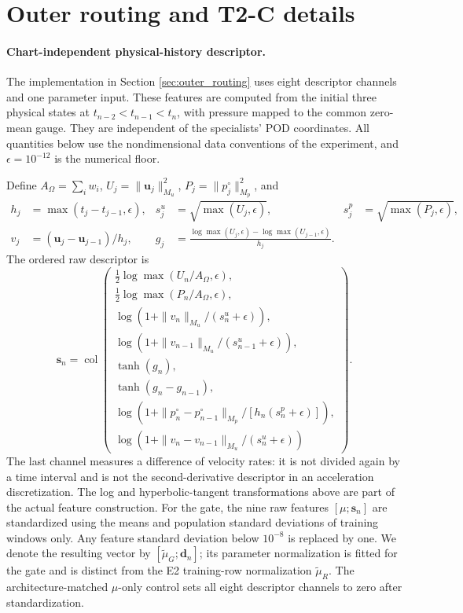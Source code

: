 \section{Outer routing and T2-C details}
\label{app:routing}


\paragraph{Chart-independent physical-history descriptor.}
The implementation  in Section \ref{sec:outer_routing} uses eight descriptor channels and one parameter input. These features are computed from the initial three physical states at $t_{n-2}<t_{n-1}<t_n$, with pressure mapped to the common zero-mean gauge. They are independent of the specialists' POD coordinates. All quantities below use the nondimensional data conventions of the experiment, and $\epsilon=10^{-12}$ is the numerical floor.

Define $A_\Omega=\sum_i w_i$, $U_j=\|\bm u_j\|_{M_u}^2$, $P_j=\|p_j^\circ\|_{M_p}^2$, and
\begin{align}
 h_j&=\max(t_j-t_{j-1},\epsilon),&
 s_j^u&=\sqrt{\max(U_j,\epsilon)},&
 s_j^p&=\sqrt{\max(P_j,\epsilon)},\\
 v_j&=(\bm u_j-\bm u_{j-1})/h_j,&
 g_j&=\frac{\log\max(U_j,\epsilon)-\log\max(U_{j-1},\epsilon)}{h_j}.
\end{align}
The ordered raw descriptor is
\begin{equation}
\bm s_n=\operatorname{col}\left(
\begin{array}{l}
 \tfrac12\log\max(U_n/A_\Omega,\epsilon),\\
 \tfrac12\log\max(P_n/A_\Omega,\epsilon),\\
 \log(1+\|v_n\|_{M_u}/(s_n^u+\epsilon)),\\
 \log(1+\|v_{n-1}\|_{M_u}/(s_{n-1}^u+\epsilon)),\\
 \tanh(g_n),\\
 \tanh(g_n-g_{n-1}),\\
 \log(1+\|p_n^\circ-p_{n-1}^\circ\|_{M_p}/[h_n(s_n^p+\epsilon)]),\\
 \log(1+\|v_n-v_{n-1}\|_{M_u}/(s_n^u+\epsilon))
\end{array}\right).
\label{eq:app_t2c_descriptor}
\end{equation}
The last channel measures a difference of velocity rates: it is not divided again by a time interval and is not the second-derivative descriptor in an acceleration discretization. The log and hyperbolic-tangent transformations above are part of the actual feature construction. For the gate, the nine raw features $[\mu;\bm s_n]$ are standardized using the means and population standard deviations of training windows only. Any feature standard deviation below $10^{-8}$ is replaced by one. We denote the resulting vector by $[\widetilde\mu_G;\bm d_n]$; its parameter normalization is fitted for the gate and is distinct from the E2 training-row normalization $\widetilde\mu_R$. The architecture-matched $\mu$-only control sets all eight descriptor channels to zero after standardization. 


